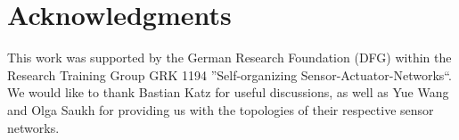 \documentclass{llncs}
\begin{document}
\section{Acknowledgments}
This work was supported by the German Research Foundation (DFG) within the Research Training Group GRK 1194 ''Self-organizing Sensor-Actuator-Networks``.
We would like to thank Bastian Katz for useful discussions, as well as Yue Wang and Olga Saukh for providing us with the topologies of their respective sensor networks.





\end{document}
